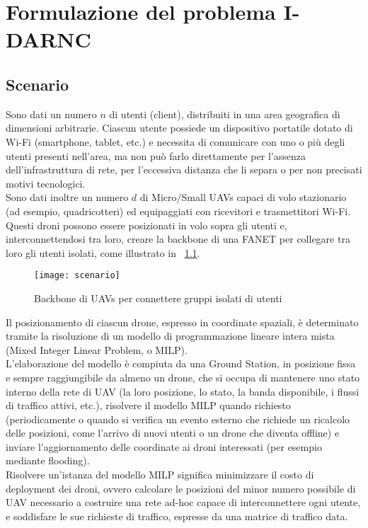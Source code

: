  \chapter{Formulazione del problema I-DARNC} \label{chap:formulazione}

\ifpdf
    \graphicspath{{Chapter3/Figs/Raster/}{Chapter3/Figs/PDF/}{Chapter3/Figs/}}
\else
    \graphicspath{{Chapter3/Figs/Vector/}{Chapter3/Figs/}}
\fi

\section{Scenario}
Sono dati un numero $n$ di utenti (client), distribuiti in una area geografica di dimensioni arbitrarie. 
Ciascun utente possiede un dispositivo portatile dotato di Wi-Fi (smartphone, tablet, etc.) e necessita di comunicare con uno o più degli utenti presenti nell'area, ma non può farlo direttamente per l'assenza dell'infrastruttura di rete, per l'eccessiva distanza che li separa o per non precisati motivi tecnologici. \\
Sono dati inoltre un numero $d$ di Micro/Small UAVs capaci di volo stazionario (ad esempio, quadricotteri) ed equipaggiati con ricevitori e trasmettitori Wi-Fi. 
Questi droni possono essere posizionati in volo sopra gli utenti e, interconnettendosi tra loro, creare la backbone di una FANET per collegare tra loro gli utenti isolati, come illustrato in \figurename\ \ref{fig:scenario}.
%
\begin{figure}
	\begin{center}
		\texttt{[image: scenario]}
	\end{center}
	\caption{Backbone di UAVs per connettere gruppi isolati di utenti} \label{fig:scenario}
\end{figure}
%
Il posizionamento di ciascun drone, espresso in coordinate spaziali, è determinato tramite la risoluzione di un modello di programmazione lineare intera mista (Mixed Integer Linear Problem, o MILP). \\
L'elaborazione del modello è compiuta da una Ground Station, in posizione fissa e sempre raggiungibile da almeno un drone, che si occupa di mantenere uno stato interno della rete di UAV (la loro posizione, lo stato, la banda disponibile, i flussi di traffico attivi, etc.), risolvere il modello MILP quando richiesto (periodicamente o quando si verifica un evento esterno che richiede un ricalcolo delle posizioni, come l'arrivo di nuovi utenti o un drone che diventa offline) e inviare l'aggiornamento delle coordinate ai droni interessati (per esempio mediante flooding). \\
Risolvere un'istanza del modello MILP significa minimizzare il costo di deployment dei droni, ovvero calcolare le posizioni del minor numero possibile di UAV necessario a costruire una rete ad-hoc capace di interconnettere ogni utente, e soddisfare le sue richieste di traffico, espresse da una matrice di traffico data. \\

